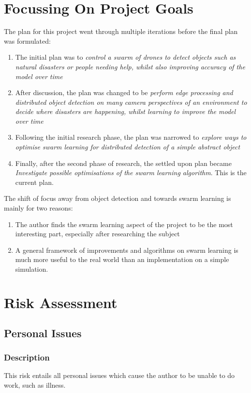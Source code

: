 \section{Focussing On Project Goals}
The plan for this project went through multiple iterations before the final plan was formulated:
\begin{enumerate}
	\item The initial plan was to \emph{control a swarm of drones to detect objects such as natural disasters or people needing help, whilst also improving accuracy of the model over time}
	\item After discussion, the plan was changed to be \emph{perform edge processing and distributed object detection on many camera perspectives of an environment to decide where disasters are happening, whilst learning to improve the model over time}
	\item Following the initial research phase, the plan was narrowed to \emph{explore ways to optimise swarm learning for distributed detection of a simple abstract object}
	\item Finally, after the second phase of research, the settled upon plan became \emph{Investigate possible optimisations of the swarm learning algorithm}. This is the current plan.
\end{enumerate}
The shift of focus away from object detection and towards swarm learning is mainly for two reasons:
\begin{enumerate}
	\item The author finds the swarm learning aspect of the project to be the most interesting part, especially after researching the subject
	\item A general framework of improvements and algorithms on swarm learning is much more useful to the real world than an implementation on a simple simulation.
\end{enumerate}

\section{Risk Assessment}
\subsection{Personal Issues}
\subsubsection{Description}
This risk entails all personal issues which cause the author to be unable to do work, such as illness.
